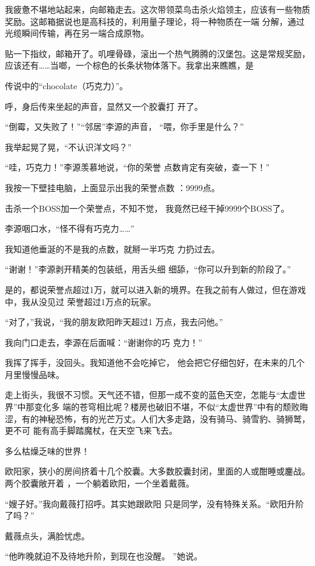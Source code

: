 \documentclass{article}
\begin{document}
我疲惫不堪地站起来，向邮箱走去。这次带领菜鸟击杀火焰领主，应该有一些物质奖励。这邮箱据说也是高科技的，利用量子理论，将一种物质在一端
分解，通过光缆瞬间传输，再在另一端合成原物。 

贴一下指纹，邮箱开了。叽哩骨碌，滚出一个热气腾腾的汉堡包。这是常规奖励，应该还有……当啷，一个棕色的长条状物体落下。我拿出来瞧瞧，是
\newpage

传说中的“chocolate（巧克力）”。 

呼，身后传来坐起的声音，显然又一个胶囊打
开了。 

“倒霉，又失败了！”“邻居”李源的声音，
“喂，你手里是什么？” 


我举起晃了晃，“不认识洋文吗？” 

“哇，巧克力！”李源羡慕地说，“你的荣誉
点数肯定有突破，查一下！” 

我按一下壁挂电脑，上面显示出我的荣誉点数
：9999点。 

击杀一个BOSS加一个荣誉点，不知不觉，
我竟然已经干掉9999个BOSS了。 


李源咽口水，“怪不得有巧克力……” 

\newpage

我知道他垂涎的不是我的点数，就掰一半巧克
力扔过去。 

“谢谢！”李源剥开精美的包装纸，用舌头细
细舔，“你可以升到新的阶段了。” 

是的，都说荣誉点超过1万，就可以进入新的境界。在我之前有人做过，但在游戏中，我从没见过
荣誉超过1万点的玩家。 

“对了，”我说，“我的朋友欧阳昨天超过1
万点，我去问他。” 

我向门口走去，李源在后面喊：“谢谢你的巧
克力！” 

我挥了挥手，没回头。我知道他不会吃掉它，
他会把它仔细包好，在未来的几个月里慢慢品味。 

走上街头，我很不习惯。天气还不错，但那一成不变的蓝色天空，怎能与“太虚世界”中那变化多
\newpage
端的苍穹相比呢？楼房也破旧不堪，不似“太虚世界”中有的颓败晦涩，有的神秘恐怖，有的光芒万丈。人们大多走路，没有骑马、骑雪豹、骑狮鹫，更不可
能有高手脚踏魔杖，在天空飞来飞去。 


多么枯燥乏味的世界！ 

欧阳家，狭小的房间挤着十几个胶囊。大多数胶囊封闭，里面的人或酣睡或鏖战。两个胶囊敞开着
，一个躺着欧阳，一个坐着戴薇。 

“嫂子好。”我向戴薇打招呼。其实她跟欧阳
只是同学，没有特殊关系。“欧阳升阶了吗？” 


戴薇点头，满脸忧虑。 

“他昨晚就迫不及待地升阶，到现在也没醒。
”她说。 
\end{document}

